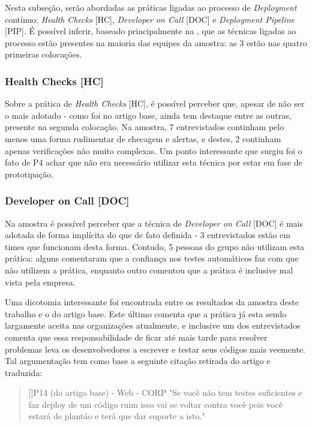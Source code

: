 Nesta subseção, serão abordadas as práticas ligadas ao processo de \emph{Deployment} contínuo: \emph{Health Checks} [HC], \emph{Developer on Call} [DOC] e \emph{Deployment Pipeline} [PIP]. É possível inferir, baseado principalmente na , que as técnicas ligadas ao processo estão presentes na maioria das equipes da amostra: as 3 estão nas quatro primeiras colocações. 

\subsubsection{Health Checks [HC]}

Sobre a prática de \emph{Health Checks} [HC], é possível perceber que, apesar de não ser o mais adotado - como foi no artigo base, ainda tem destaque entre as outras, presente na segunda colocação. Na amostra, 7 entrevistados continham pelo menos uma forma rudimentar de checagem e alertas, e destes, 2 continham apenas verificações não muito complexas. Um ponto interessante que surgiu foi o fato de P4 achar que não era necessário utilizar esta técnica por estar em fase de prototipação.

\subsubsection{Developer on Call [DOC]}

Na amostra é possível perceber que a técnica de \emph{Developer on Call} [DOC] é mais adotada de forma implícita do que de fato definida - 3 entrevistados estão em times que funcionam desta forma. Contudo, 5 pessoas do grupo não utilizam esta prática: alguns comentaram que a confiança nos testes automáticos faz com que não utilizem a prática, enquanto outro comentou que a prática é inclusive mal vista pela empresa.

Uma dicotomia interessante foi encontrada entre os resultados da amostra deste trabalho e o do artigo base. Este último comenta que a prática já esta sendo largamente aceita nas organizações atualmente, e inclusive um dos entrevistados comenta que essa responsabilidade de ficar até mais tarde para resolver problemas leva os desenvolvedores a escrever e testar seus códigos mais veemente. Tal argumentação tem como base a seguinte citação retirada do artigo e traduzida:

\begin{quotation}[]{P14 (do artigo base) - Web - CORP}
    "Se você não tem testes suficientes e faz deploy de um código ruim isso vai se voltar contra você pois você estará de plantão e terá que dar suporte a isto."
\end{quotation}

